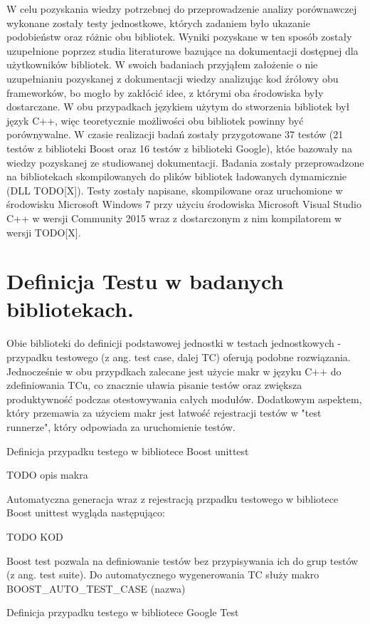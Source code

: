 \documentclass[12pt,a4paper,notitlepage]{report}
\begin{document}
W celu pozyskania wiedzy potrzebnej do przeprowadzenie analizy porównawczej wykonane zostały testy jednostkowe, których zadaniem było ukazanie podobieństw oraz różnic obu bibliotek. Wyniki pozyskane w ten sposób zostały uzupełnione poprzez studia literaturowe bazujące na dokumentacji dostępnej dla użytkowników bibliotek.
W swoich badaniach przyjąłem założenie o nie uzupełnianiu pozyskanej z dokumentacji wiedzy analizując kod źrółowy obu frameworków, bo mogło by zakłócić idee, z którymi oba środowiska były dostarczane. W obu przypadkach językiem użytym do stworzenia bibliotek był język C++, więc teoretycznie możliwości obu bibliotek powinny być porównywalne.
W czasie realizacji badań zostały przygotowane 37 testów (21 testów z biblioteki Boost oraz 16 testów z biblioteki Google), któe bazowały na wiedzy pozyskanej ze studiowanej dokumentacji.
Badania zostały przeprowadzone na bibliotekach skompilowanych do plików bibliotek ładowanych dymamicznie (DLL TODO[X]). Testy zostały napisane, skompilowane oraz uruchomione w środowisku Microsoft Windows 7 przy użyciu środowiska Microsoft Visual Studio C++ w wersji Community 2015 wraz z dostarczonym z nim kompilatorem w wersji TODO[X].

\chapter{Definicja Testu w badanych bibliotekach.}

Obie biblioteki do definicji podstawowej jednostki w testach jednostkowych - przypadku testowego (z ang. test case, dalej TC) oferują podobne rozwiązania. Jednocześnie w obu przypdkach zalecane jest użycie makr w języku C++ do zdefiniowania TCu, co znacznie uławia pisanie testów oraz zwiększa produktywność podczas otestowywania całych modułów.
Dodatkowym aspektem, który przemawia za użyciem makr jest łatwość rejestracji testów w "test runnerze", który odpowiada za uruchomienie testów.

Definicja przypadku testego w bibliotece Boost unittest

TODO opis makra

Automatyczna generacja wraz z rejestracją przpadku testowego w bibliotece Boost unittest wygląda następująco:

TODO KOD

Boost test pozwala na definiowanie testów bez przypisywania ich do grup testów (z ang. test suite). Do automatycznego wygenerowania TC służy makro 
BOOST_AUTO_TEST_CASE
(nazwa)
{}

Definicja przypadku testego w bibliotece Google Test
\end{document}
